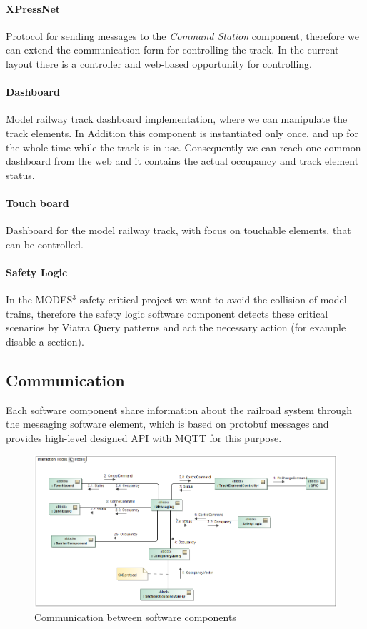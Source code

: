 \paragraph{XPressNet}
Protocol for sending messages to the \textit{Command Station} component, therefore we can extend the communication form for controlling the track. In the current layout there is a controller and web-based opportunity for controlling.
\paragraph{Dashboard}
Model railway track dashboard implementation, where we can manipulate the track elements. In Addition this component is instantiated only once, and up for the whole time while the track is in use. Consequently we can reach one common dashboard from the web and it contains the actual occupancy and track element status.
\paragraph{Touch board}
Dashboard for the model railway track, with focus on touchable elements, that can be controlled.
\paragraph{Safety Logic}
In the MODES$^3$ safety critical project we want to avoid the collision of model trains, therefore the safety logic software component detects these critical scenarios by Viatra Query \cite{Viatra} patterns and act the necessary action (for example disable a section).

\subsection{Communication}
Each software component share information about the railroad system through the messaging software element, which is based on protobuf messages and provides high-level designed API with MQTT for this purpose. 
\begin{figure}[!h]
	\centering
	\includegraphics[width=150mm, keepaspectratio]{figures/modes3/CommunicationModel.png}
	\caption{Communication between software components}
	\label{fig:communicationModel}
\end{figure}

